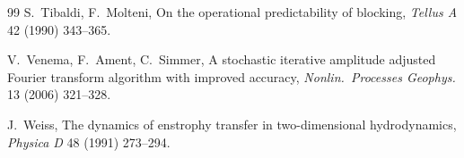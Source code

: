 \documentclass[11pt,a4paper]{article}
\begin{document}
\begin{thebibliography}{99}
 S.~Tibaldi, F.~Molteni, On the operational
predictability of blocking, \emph{Tellus A} 42 (1990) 343--365.

 V.~Venema, F.~Ament, C.~Simmer, A stochastic iterative
amplitude adjusted Fourier transform algorithm with improved accuracy,
\emph{Nonlin.\ Processes Geophys.} 13 (2006) 321--328.

 J.~Weiss, The dynamics of enstrophy transfer in
two-dimensional hydrodynamics, \emph{Physica D} 48 (1991) 273--294.

\end{thebibliography}
\end{document}
